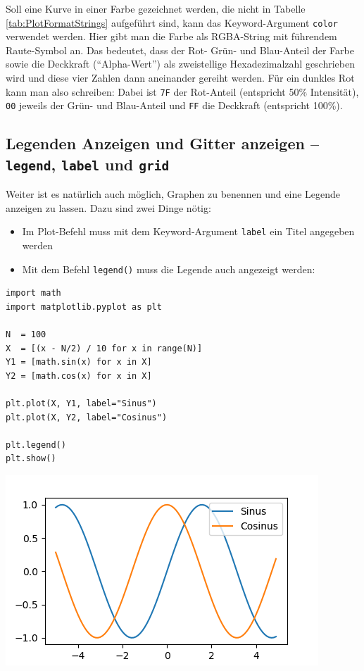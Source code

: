 Soll eine Kurve in einer Farbe gezeichnet werden, die nicht in Tabelle \ref{tab:PlotFormatStrings} aufgeführt sind, kann das Keyword-Argument \texttt{color} verwendet werden. Hier gibt man die Farbe als RGBA-String mit führendem Raute-Symbol an. Das bedeutet, dass der Rot- Grün- und Blau-Anteil der Farbe sowie die Deckkraft (\enquote{Alpha-Wert}) als zweistellige Hexadezimalzahl geschrieben wird und diese vier Zahlen dann aneinander gereiht werden. Für ein dunkles Rot kann man also schreiben:
Dabei ist \texttt{7F} der Rot-Anteil (entspricht 50\% Intensität), \texttt{00} jeweils der Grün- und Blau-Anteil und \texttt{FF} die Deckkraft (entspricht 100\%).

\subsection{Legenden Anzeigen und Gitter anzeigen -- \texttt{legend}, \texttt{label} und \texttt{grid}}
Weiter ist es natürlich auch möglich, Graphen zu benennen und eine Legende anzeigen zu lassen. Dazu sind zwei Dinge nötig:
\begin{itemize}
\item Im Plot-Befehl muss mit dem Keyword-Argument \texttt{label} ein Titel angegeben werden
\item Mit dem Befehl \texttt{legend()} muss die Legende auch angezeigt werden:
\end{itemize}

\begin{codebox}[Beispiel: Plot mit Legende, width=.55\linewidth, nobeforeafter, equal height group = grpXmpSimplePlotLegend]
\begin{verbatim}
import math
import matplotlib.pyplot as plt

N  = 100
X  = [(x - N/2) / 10 for x in range(N)]
Y1 = [math.sin(x) for x in X]
Y2 = [math.cos(x) for x in X]

plt.plot(X, Y1, label="Sinus")
plt.plot(X, Y2, label="Cosinus")

plt.legend()
plt.show()
\end{verbatim}
\end{codebox}
%
\begin{tcolorbox}[title=Ausgabe: Plot mit Legende, width=.45\linewidth, nobeforeafter, equal height group = grpXmpSimplePlotLegend]
	\includegraphics[width=\linewidth]{./gfx/plt-legend}
\end{tcolorbox}

